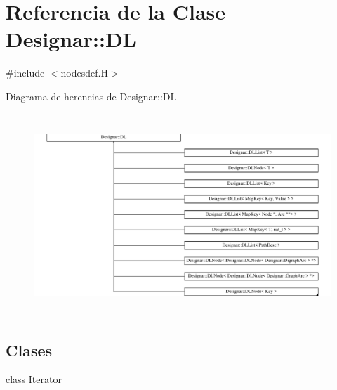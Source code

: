 \hypertarget{class_designar_1_1_d_l}{}\section{Referencia de la Clase Designar\+:\+:DL}
\label{class_designar_1_1_d_l}


{\ttfamily \#include $<$nodesdef.\+H$>$}

Diagrama de herencias de Designar\+:\+:DL\begin{figure}[H]
\begin{center}
\leavevmode
\includegraphics[height=7.623763cm]{class_designar_1_1_d_l}
\end{center}
\end{figure}
\subsection*{Clases}
\begin{DoxyCompactItemize}
\item 
class \hyperlink{class_designar_1_1_d_l_1_1_iterator}{Iterator}
\end{DoxyCompactItemize}
